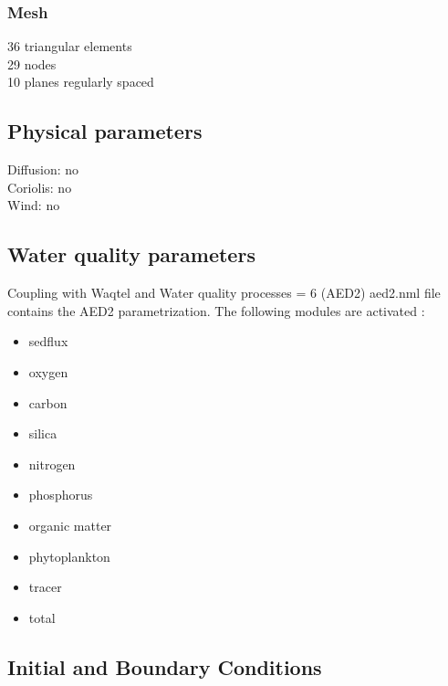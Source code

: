 \subsubsection{Mesh}
%
36 triangular elements\\
29 nodes\\
10 planes regularly spaced
%
%
%
%
\subsection{Physical parameters}
%
Diffusion: no\\
Coriolis: no\\
Wind: no
%
%
%
%
%
\subsection{Water quality parameters}
Coupling with Waqtel and Water quality processes = 6 (AED2)
aed2.nml file contains the AED2 parametrization. The following modules are activated :
\begin{itemize}
	\item sedflux
	\item oxygen
	\item carbon
	\item silica
	\item nitrogen
	\item phosphorus 
	\item organic matter
	\item phytoplankton
	\item tracer
	\item total
\end{itemize}
%
\subsection{Initial and Boundary Conditions}
%
